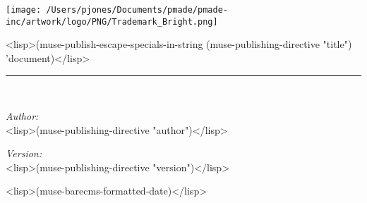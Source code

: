 \documentclass[12pt,titlepage]{article}
\begin{document}
\begin{titlepage}
\begin{center}

\texttt{[image: /Users/pjones/Documents/pmade/pmade-inc/artwork/logo/PNG/Trademark\_Bright.png]}\\[1cm]

\begin{huge}
<lisp>(muse-publish-escape-specials-in-string 
  (muse-publishing-directive "title") 'document)</lisp>
\par
\end{huge}

\rule{\linewidth}{0.5mm} \\[1.5cm]

\begin{minipage}{0.4\textwidth}
\begin{flushleft} \large
\emph{Author:}\\
<lisp>(muse-publishing-directive "author")</lisp>
\end{flushleft}
\end{minipage}
\begin{minipage}{0.4\textwidth}
\begin{flushright} \large
\emph{Version:}\\
<lisp>(muse-publishing-directive "version")</lisp>
\end{flushright}
\end{minipage}

\vfill
{\large <lisp>(muse-barecms-formatted-date)</lisp>}

\end{center}
\end{titlepage}

\tableofcontents
\newpage
\end{document}
